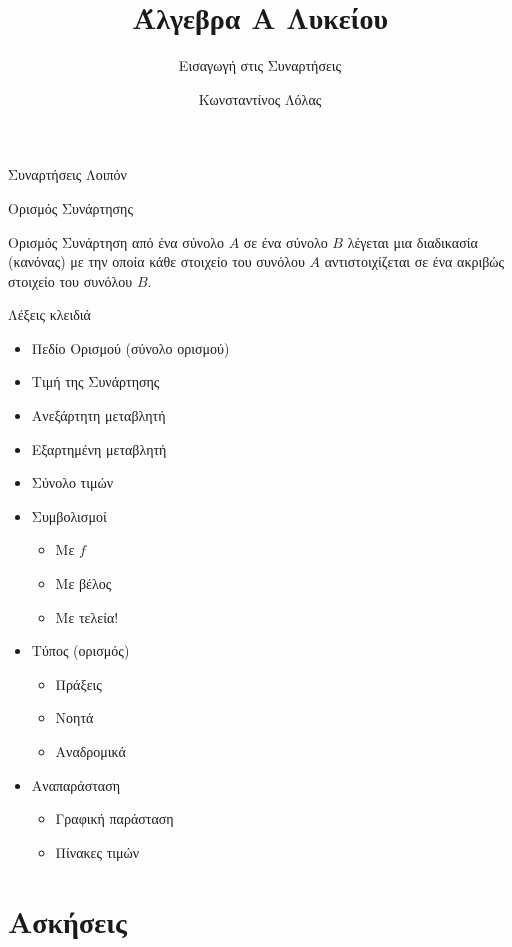 \documentclass{../../presentation}
\title{Άλγεβρα Α Λυκείου}
\subtitle{Εισαγωγή στις Συναρτήσεις}
\author[Λόλας]{Κωνσταντίνος Λόλας}
\date{}
\begin{document}
\frame{\titlepage}

\begin{frame}{Συναρτήσεις Λοιπόν}

\end{frame}

\begin{frame}{Ορισμός Συνάρτησης}

  \begin{block}{Ορισμός}
    Συνάρτηση από ένα σύνολο $Α$ σε ένα σύνολο $Β$ λέγεται μια διαδικασία (κανόνας) με την οποία κάθε στοιχείο του συνόλου $Α$ αντιστοιχίζεται σε ένα ακριβώς στοιχείο του συνόλου $Β$.
  \end{block}
\end{frame}

\begin{frame}
  Λέξεις κλειδιά
  \begin{itemize}[<+->]
    \item Πεδίο Ορισμού (σύνολο ορισμού)
    \item Τιμή της Συνάρτησης
    \item Ανεξάρτητη μεταβλητή
    \item Εξαρτημένη μεταβλητή
    \item Σύνολο τιμών
    \item Συμβολισμοί
          \begin{itemize}[<+->]
            \item Με $f$
            \item Με βέλος
            \item Με τελεία!
          \end{itemize}
    \item Τύπος (ορισμός)
          \begin{itemize}[<+->]
            \item Πράξεις
            \item Νοητά
            \item Αναδρομικά
          \end{itemize}
    \item Αναπαράσταση
          \begin{itemize}[<+->]
            \item Γραφική παράσταση
            \item Πίνακες τιμών
          \end{itemize}
  \end{itemize}
\end{frame}

\section{Ασκήσεις}
\end{document}
